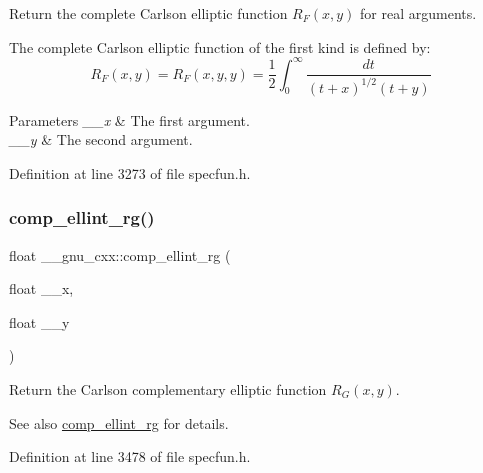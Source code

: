 Return the complete Carlson elliptic function $ R_F(x,y) $ for real arguments.

The complete Carlson elliptic function of the first kind is defined by\+: \[ R_F(x,y) = R_F(x,y,y) = \frac{1}{2} \int_0^\infty \frac{dt}{(t + x)^{1/2}(t + y)} \]


\begin{DoxyParams}{Parameters}
{\em \+\_\+\+\_\+x} & The first argument. \\
\hline
{\em \+\_\+\+\_\+y} & The second argument. \\
\hline
\end{DoxyParams}


Definition at line 3273 of file specfun.\+h.

\mbox{\label{group__mathsf__gnu_ga978f8eec6e5edc918b243925dbacb65b}} 
\subsubsection{\texorpdfstring{comp\+\_\+ellint\+\_\+rg()}{comp\_ellint\_rg()}\hspace{0.1cm}{\footnotesize\ttfamily [1/3]}}
{\footnotesize\ttfamily float \+\_\+\+\_\+gnu\+\_\+cxx\+::comp\+\_\+ellint\+\_\+rg (\begin{DoxyParamCaption}\item[{float}]{\+\_\+\+\_\+x,  }\item[{float}]{\+\_\+\+\_\+y }\end{DoxyParamCaption})\hspace{0.3cm}{\ttfamily [inline]}}

Return the Carlson complementary elliptic function $ R_G(x,y) $.

\begin{DoxySeeAlso}{See also}
\hyperlink{group__mathsf__gnu_ga978f8eec6e5edc918b243925dbacb65b}{comp\+\_\+ellint\+\_\+rg} for details. 
\end{DoxySeeAlso}


Definition at line 3478 of file specfun.\+h.

\mbox{\label{group__mathsf__gnu_gaca5fa8ee8125afc8f35ec6b27806e873}} 
